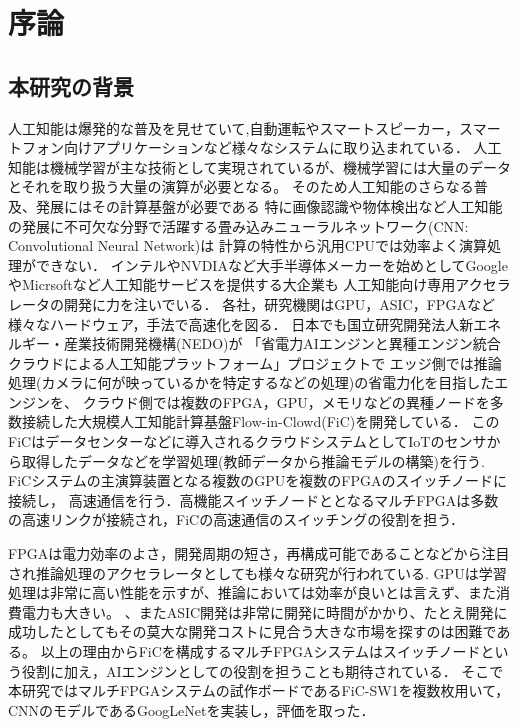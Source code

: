 \chapter{序論}
{
    \label{chap:introducion}

    \section{本研究の背景}
    \label{sec:backgroud}
    人工知能は爆発的な普及を見せていて,自動運転やスマートスピーカー，スマートフォン向けアプリケーションなど様々なシステムに取り込まれている．
    人工知能は機械学習が主な技術として実現されているが、機械学習には大量のデータとそれを取り扱う大量の演算が必要となる。
    そのため人工知能のさらなる普及、発展にはその計算基盤が必要である
    特に画像認識や物体検出など人工知能の発展に不可欠な分野で活躍する畳み込みニューラルネットワーク(CNN: Convolutional Neural Network)は
    計算の特性から汎用CPUでは効率よく演算処理ができない．
    インテルやNVDIAなど大手半導体メーカーを始めとしてGoogleやMicrsoftなど人工知能サービスを提供する大企業も
    人工知能向け専用アクセラレータの開発に力を注いでいる．
    各社，研究機関はGPU，ASIC，FPGAなど様々なハードウェア，手法で高速化を図る．
    日本でも国立研究開発法人新エネルギー・産業技術開発機構(NEDO)が
    「省電力AIエンジンと異種エンジン統合クラウドによる人工知能プラットフォーム」プロジェクトで
    エッジ側では推論処理(カメラに何が映っているかを特定するなどの処理)の省電力化を目指したエンジンを、
    クラウド側では複数のFPGA，GPU，メモリなどの異種ノードを多数接続した大規模人工知能計算基盤Flow-in-Clowd(FiC)を開発している．
    このFiCはデータセンターなどに導入されるクラウドシステムとしてIoTのセンサから取得したデータなどを学習処理(教師データから推論モデルの構築)を行う.
    FiCシステムの主演算装置となる複数のGPUを複数のFPGAのスイッチノードに接続し，
    高速通信を行う．高機能スイッチノードととなるマルチFPGAは多数の高速リンクが接続され，FiCの高速通信のスイッチングの役割を担う．

    FPGAは電力効率のよさ，開発周期の短さ，再構成可能であることなどから注目され推論処理のアクセラレータとしても様々な研究が行われている.
    GPUは学習処理は非常に高い性能を示すが、推論においては効率が良いとは言えず、また消費電力も大きい。
    、またASIC開発は非常に開発に時間がかかり、たとえ開発に成功したとしてもその莫大な開発コストに見合う大きな市場を探すのは困難である。
    以上の理由からFiCを構成するマルチFPGAシステムはスイッチノードという役割に加え，AIエンジンとしての役割を担うことも期待されている．
    そこで本研究ではマルチFPGAシステムの試作ボードであるFiC-SW1を複数枚用いて，CNNのモデルであるGoogLeNetを実装し，評価を取った．

}
